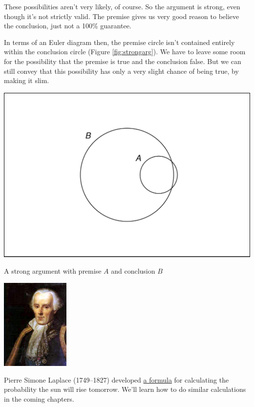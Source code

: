 \documentclass[justified]{tufte-book}
\theoremstyle{definition}
\theoremstyle{definition}
\theoremstyle{definition}
\theoremstyle{definition}
\theoremstyle{remark}
\begin{document}
These possibilities aren't very likely, of course. So the argument is strong, even though it's not strictly valid. The premise gives us very good reason to believe the conclusion, just not a 100\% guarantee.

In terms of an Euler diagram then, the premise circle isn't contained entirely within the conclusion circle (Figure \ref{fig:strongarg}). We have to leave some room for the possibility that the premise is true and the conclusion false. But we can still convey that this possibility has only a very slight chance of being true, by making it slim.

\begin{marginfigure}
\includegraphics{_main_files/figure-latex/strongarg-1} \caption[A strong argument with premise $A$ and conclusion $B$]{A strong argument with premise $A$ and conclusion $B$}\label{fig:strongarg}
\end{marginfigure}



\begin{marginfigure}
\includegraphics[width=1.33in]{img/laplace} \caption[Pierre Simone Laplace (1749--1827) developed \href{https://bit.ly/2mU9WgW}{a formula} for calculating the probability the sun will rise tomorrow. We'll learn how to do similar calculations in the coming chapters.]{Pierre Simone Laplace (1749--1827) developed \href{https://bit.ly/2mU9WgW}{a formula} for calculating the probability the sun will rise tomorrow. We'll learn how to do similar calculations in the coming chapters.}\label{fig:laplace}
\end{marginfigure}
\end{document}
